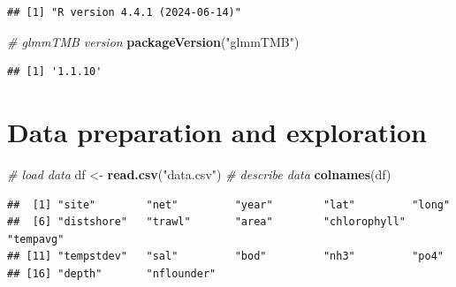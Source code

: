 \documentclass[
]{article}
\newenvironment{Shaded}{\begin{snugshade}}{\end{snugshade}}
\newcommand{\AttributeTok}[1]{\textcolor[rgb]{0.13,0.29,0.53}{#1}}
\newcommand{\CommentTok}[1]{\textcolor[rgb]{0.56,0.35,0.01}{\textit{#1}}}
\newcommand{\DecValTok}[1]{\textcolor[rgb]{0.00,0.00,0.81}{#1}}
\newcommand{\FunctionTok}[1]{\textcolor[rgb]{0.13,0.29,0.53}{\textbf{#1}}}
\newcommand{\NormalTok}[1]{#1}
\newcommand{\OtherTok}[1]{\textcolor[rgb]{0.56,0.35,0.01}{#1}}
\newcommand{\SpecialCharTok}[1]{\textcolor[rgb]{0.81,0.36,0.00}{\textbf{#1}}}
\newcommand{\StringTok}[1]{\textcolor[rgb]{0.31,0.60,0.02}{#1}}
\begin{document}
\begin{Shaded}
\end{Shaded}

\begin{Shaded}
\end{Shaded}

\begin{verbatim}
## [1] "R version 4.4.1 (2024-06-14)"
\end{verbatim}

\begin{Shaded}
\begin{Highlighting}[]
\CommentTok{\# glmmTMB version}
\FunctionTok{packageVersion}\NormalTok{(}\StringTok{"glmmTMB"}\NormalTok{)}
\end{Highlighting}
\end{Shaded}

\begin{verbatim}
## [1] '1.1.10'
\end{verbatim}

\section{Data preparation and
exploration}\label{data-preparation-and-exploration}

\begin{Shaded}
\begin{Highlighting}[]
\CommentTok{\# load data}
\NormalTok{df }\OtherTok{\textless{}{-}} \FunctionTok{read.csv}\NormalTok{(}\StringTok{"data.csv"}\NormalTok{)}
\CommentTok{\# describe data}
\FunctionTok{colnames}\NormalTok{(df)}
\end{Highlighting}
\end{Shaded}

\begin{verbatim}
##  [1] "site"        "net"         "year"        "lat"         "long"       
##  [6] "distshore"   "trawl"       "area"        "chlorophyll" "tempavg"    
## [11] "tempstdev"   "sal"         "bod"         "nh3"         "po4"        
## [16] "depth"       "nflounder"
\end{verbatim}
\end{document}
